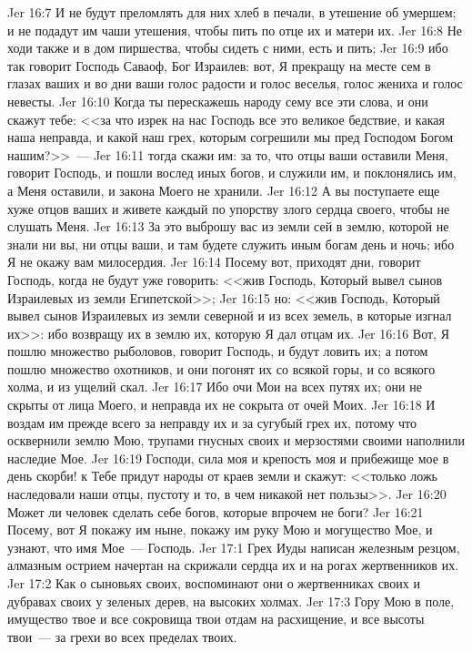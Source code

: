 \vs Jer 16:7 И не будут преломлять для них хлеб в печали, в утешение об умершем; и не подадут им чаши утешения, чтобы пить по отце их и матери их.
\vs Jer 16:8 Не ходи также и в дом пиршества, чтобы сидеть с ними, есть и пить;
\vs Jer 16:9 ибо так говорит Господь Саваоф, Бог Израилев: вот, Я прекращу на месте сем в глазах ваших и во дни ваши голос радости и голос веселья, голос жениха и голос невесты.
\vs Jer 16:10 Когда ты перескажешь народу сему все эти слова, и они скажут тебе: <<за что изрек на нас Господь все это великое бедствие, и какая наша неправда, и какой наш грех, которым согрешили мы пред Господом Богом нашим?>>~---
\vs Jer 16:11 тогда скажи им: за то, что отцы ваши оставили Меня, говорит Господь, и пошли вослед иных богов, и служили им, и поклонялись им, а Меня оставили, и закона Моего не хранили.
\vs Jer 16:12 А вы поступаете еще хуже отцов ваших и живете каждый по упорству злого сердца своего, чтобы не слушать Меня.
\vs Jer 16:13 За это выброшу вас из земли сей в землю, которой не знали ни вы, ни отцы ваши, и там будете служить иным богам день и ночь; ибо Я не окажу вам милосердия.
\vs Jer 16:14 Посему вот, приходят дни, говорит Господь, когда не будут уже говорить: <<жив Господь, Который вывел сынов Израилевых из земли Египетской>>;
\vs Jer 16:15 но: <<жив Господь, Который вывел сынов Израилевых из земли северной и из всех земель, в которые изгнал их>>: ибо возвращу их в землю их, которую Я дал отцам их.
\vs Jer 16:16 Вот, Я пошлю множество рыболовов, говорит Господь, и будут ловить их; а потом пошлю множество охотников, и они погонят их со всякой горы, и со всякого холма, и из ущелий скал.
\vs Jer 16:17 Ибо очи Мои на всех путях их; они не скрыты от лица Моего, и неправда их не сокрыта от очей Моих.
\vs Jer 16:18 И воздам им прежде всего за неправду их и за сугубый грех их, потому что осквернили землю Мою, трупами гнусных своих и мерзостями своими наполнили наследие Мое.
\vs Jer 16:19 Господи, сила моя и крепость моя и прибежище мое в день скорби! к Тебе придут народы от краев земли и скажут: <<только ложь наследовали наши отцы, пустоту и то, в чем никакой нет пользы>>.
\vs Jer 16:20 Может ли человек сделать себе богов, которые впрочем не боги?
\vs Jer 16:21 Посему, вот Я покажу им ныне, покажу им руку Мою и могущество Мое, и узнают, что имя Мое~--- Господь.
\vs Jer 17:1 Грех Иуды написан железным резцом, алмазным острием начертан на скрижали сердца их и на рогах жертвенников их.
\vs Jer 17:2 Как о сыновьях своих, воспоминают они о жертвенниках своих и дубравах своих у зеленых дерев, на высоких холмах.
\vs Jer 17:3 Гору Мою в поле, имущество твое и все сокровища твои отдам на расхищение, и все высоты твои~--- за грехи во всех пределах твоих.
